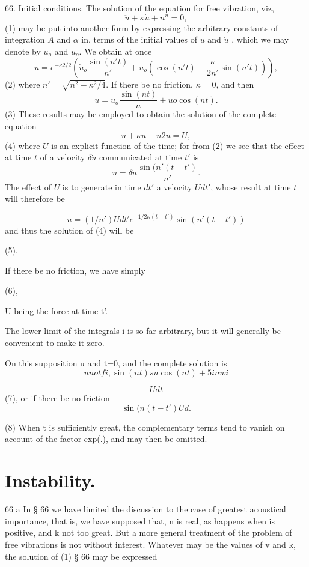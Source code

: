66. Initial conditions. The solution of the equation for free vibration, viz,
\[ \ddot{u} + \kappa \dot{u} + n^ u = 0,\]
(1) may be put into another form by expressing the arbitrary constants of
integration \(A\) and \(\alpha \) in, terms of the initial values of
\(u\) and \(\dot{u}\) , which we may denote by
\(u_o\) and \(\dot{u}_o\).
We obtain at once
\[
u= e^{-\kappa 2/2} \left( \dot{u}_o \frac{ \sin( n' t)}{n'} +
u_o \left( \cos(n' t) + \frac{ \kappa}{2n'} \sin( n' t) \right) \right),
\]
(2) where \(n'= \sqrt{ n^2 - \kappa^2/4}\).  If there be no friction, \(\kappa =
0\), and then
\[u = \dot{u}_o \frac{ \sin( n t)}{n} + uo  \cos(nt).\]
(3) These results may be employed to obtain the solution of the complete equation
\[u + \kappa u + n2 u = U,\]
(4) where \(U\) is an explicit function of the time;
for from (2) we see that the effect at time \(t\) of a velocity
\(\delta \dot{u}\) communicated at time \(t'\) is
\[u= \delta \dot{u} \frac{ \sin( n' (t-t')}{n'}. \]
The effect of \(U\) is to generate in time \(dt'\) a velocity \(U dt'\),
whose result at time \(t\) will therefore be


\[u = (1/n') U dt' e^{-1/2 \kappa (t-t') } \sin(n' (t-t'))\]
and thus the solution of (4) will be

(5).

If there be no friction, we have simply

(6),

U being the force at time t'.

The lower limit of the integrals i is so far arbitrary, but it will generally
be convenient to make it zero.

On this supposition u and t=0, and the complete solution is
\[un ot fi, \sin(nt) su \cos(nt) + 5 in wi\]

\[U dt\]
(7), or if there be no friction
\[\sin(n (t-t') Ud.\]

(8) When t is sufficiently great, the complementary terms tend to vanish on
account of the factor exp(.), and may then be omitted.

\section{Instability.}
66 a In § 66 we have limited the discussion to the case of
greatest acoustical importance, that is, we have supposed that, n is real, as
happens when is positive, and k not too great. But a more general treatment of
the problem of free vibrations is not without interest. Whatever may be the
values of v and k, the solution of (1) § 66 may be expressed

